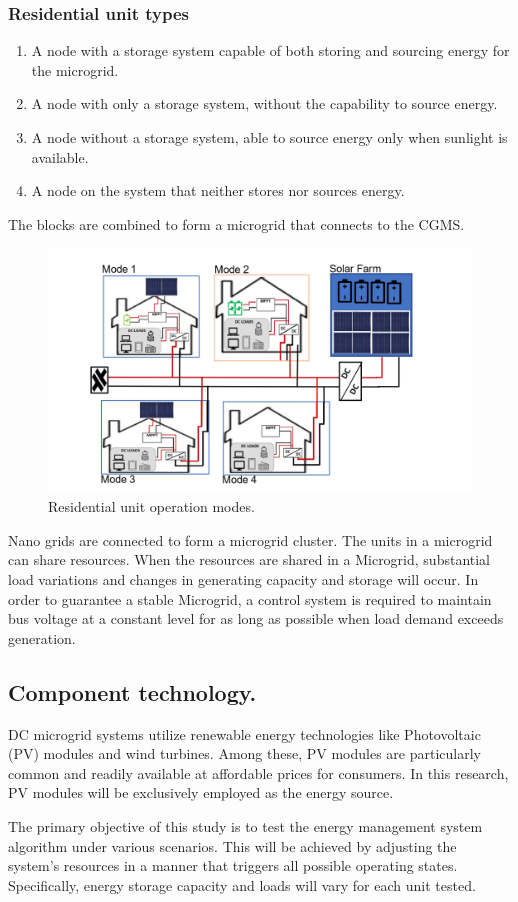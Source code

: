\subsubsection{Residential unit types}
\begin{enumerate}[nolistsep]
	\item A node with a storage system capable of both storing and sourcing energy for the microgrid.
	\item A node with only a storage system, without the capability to source energy.
	\item A node without a storage system, able to source energy only when sunlight is available.
	\item A node on the system that neither stores nor sources energy.
\end{enumerate}

The blocks are combined to form a microgrid that connects to the CGMS.
\begin{figure}[H]
	\centering
	\includegraphics[totalheight=8cm]{Figures/re dc mg.png}
	\caption{Residential unit operation modes.}
\end{figure}

Nano grids are connected to form a microgrid cluster. The units in a microgrid can share resources. When the resources are shared in a Microgrid, substantial load variations and changes in generating capacity and storage will occur. In order to guarantee a stable Microgrid, a control system is required to maintain bus voltage at a constant level for as long as possible when load demand exceeds generation.

\subsection{Component technology.}
DC microgrid systems utilize renewable energy technologies like Photovoltaic (PV) modules and wind turbines. Among these, PV modules are particularly common and readily available at affordable prices for consumers. In this research, PV modules will be exclusively employed as the energy source.\par
The primary objective of this study is to test the energy management system algorithm under various scenarios. This will be achieved by adjusting the system's resources in a manner that triggers all possible operating states. Specifically, energy storage capacity and loads will vary for each unit tested.\par

